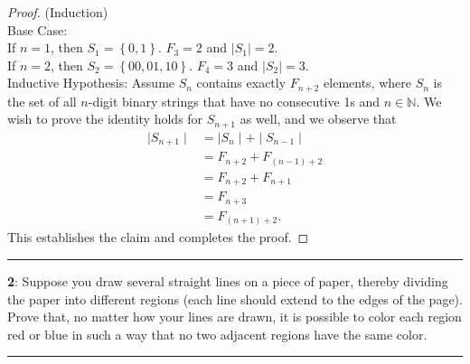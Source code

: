 \documentclass[11pt]{article}
\newcommand\question[2]{\vspace{.25in}\hrule\textbf{#1}: #2\vspace{.5em}\hrule\vspace{.10in}}
\newcommand{\N}{\mathbb{N}}
\begin{document}
	\begin{proof}
		(Induction)\\
		Base Case:\\
		If $n=1$, then $S_1 = \left\{0, 1\right\}$. $F_3 = 2$ and $\left|S_1\right|= 2$.\\
		If $n=2$, then $S_2 = \left\{00, 01, 10\right\}$. $F_4 = 3$ and $\left|S_2\right|= 3$.\\
		Inductive Hypothesis: Assume $S_n$ contains exactly $F_{n+2}$ elements, where $S_n$ is the set of all $n$-digit binary strings that have no consecutive 1s and $n \in \N$. We wish to prove the identity holds for $S_{n+1}$ as well, and we observe that
		\begin{align*}
			\mid S_{n+1} \mid &= \mid S_n \mid + \mid S_{n-1} \mid\\
			&= F_{n+2} + F_{(n-1)+2}\\
			&= F_{n+2} + F_{n+1}\\
			&= F_{n+3}\\
			&= F_{(n+1)+2}.
		\end{align*}
		This establishes the claim and completes the proof.
	\end{proof}

	\newpage

\question{2}{Suppose you draw several straight lines on a piece of paper, thereby dividing the paper into different regions (each line should extend to the edges of the page). Prove that, no matter how your lines are drawn, it is possible to color each region red or blue in such a way that no two adjacent regions have the same color.}
\end{document}
